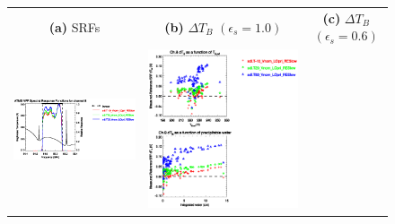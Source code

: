 \begin{figure}[H]
  \centering
  \begin{tabular}{c c c}
    \textsf{\textbf{(a)} SRFs} &
    \textsf{\textbf{(b)} $\Delta T_B$ $(\epsilon_s = 1.0)$} &
    \textsf{\textbf{(c)} $\Delta T_B$ $(\epsilon_s = 0.6)$} \\
    \includegraphics[bb=80 400 280 558,clip,scale=0.85]{graphics/srf/Tset/atms_npp.ch8.osrf.eps} &
    \includegraphics[bb=85 400 260 558,clip,scale=0.85]{graphics/dtb/Tset/e1.0_r0.0/atms_npp.ch8.dTb.eps} & 

\end{tabular}
\end{figure}
